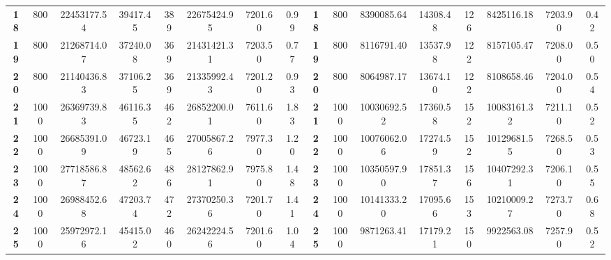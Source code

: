 \begin{table}[htbp]
{\begin{tabular}{cccccccccccccccc}
    \textbf{18}  & 800  & 22453177.54        & 39417.45  & 389               & 22675424.95       & 7201.60 & 0.99 & \textbf{18}  & 800  & 8390085.64         & 14308.48  & 126               & 8425116.18       & 7203.90 & 0.42  \\
    \textbf{19}  & 800  & 21268714.07        & 37240.08  & 369               & 21431421.31       & 7203.50 & 0.77 & \textbf{19}  & 800  & 8116791.40         & 13537.98  & 122               & 8157105.47       & 7208.00 & 0.50  \\
    \textbf{20}  & 800  & 21140436.83        & 37106.25  & 369               & 21335992.43       & 7201.20 & 0.93 & \textbf{20}  & 800  & 8064987.17         & 13674.10  & 122               & 8108658.46       & 7204.00 & 0.54  \\
    \textbf{21}  & 1000  & 26369739.83        & 46116.35  & 462               & 26852200.01       & 7611.60 & 1.83 & \textbf{21}  & 1000  & 10030692.52         & 17360.58  & 152               & 10083161.32       & 7211.10 & 0.52  \\
    \textbf{22}  & 1000  & 26685391.09        & 46723.19  & 465               & 27005867.26       & 7977.30 & 1.20 & \textbf{22}  & 1000  & 10076062.06         & 17274.59  & 152               & 10129681.55       & 7268.50 & 0.53  \\
    \textbf{23}  & 1000  & 27718586.87        & 48562.62  & 486               & 28127862.91       & 7975.80 & 1.48 & \textbf{23}  & 1000  & 10350597.90         & 17851.37  & 156               & 10407292.31       & 7206.10 & 0.55  \\
    \textbf{24}  & 1000  & 26988452.68        & 47203.74  & 472               & 27370250.36       & 7201.70 & 1.41 & \textbf{24}  & 1000  & 10141333.20         & 17095.66  & 153               & 10210009.27       & 7273.70 & 0.68  \\
    \textbf{25}  & 1000  & 25972972.16        & 45415.02  & 460               & 26242224.56       & 7201.60 & 1.04 & \textbf{25}  & 1000  & 9871263.41         & 17179.21  & 150               & 9922563.08       & 7257.90 & 0.52  \\    
    \bottomrule
    \end{tabular}
    }
    \end{table}